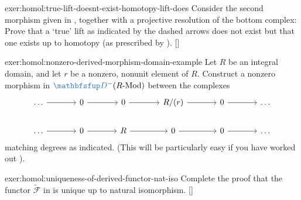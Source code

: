 \begin{exer}{\exerused{}}{exer:homol:true-lift-doesnt-exist-homotopy-lift-does}
  Consider the second morphism given in
  ,
  together with a projective resolution of the bottom complex:
  Prove that a `true' lift as indicated by the dashed arrows does not
  exist but that one exists up to homotopy (as prescribed by
  ). []
\end{exer}
\begin{exer}{}{exer:homol:nonzero-derived-morphism-domain-example}
  Let $R$ be an integral domain, and let $r$ be a nonzero, nonunit
  element of $R$. Construct a nonzero morphism in
  $\categ{D}^-(R\text{-Mod})$ between the complexes
  \[\begin{tikzcd}[column sep=large]
      \dots \arrow[r] & 0 \arrow[r] & 0 \arrow[r] & R/(r) \arrow[r] &
      0 \arrow[r] & \dots \\
      \dots \arrow[r] & 0 \arrow[r] & R \arrow[r] & 0 \arrow[r] & 0
      \arrow[r] & \dots
    \end{tikzcd}\] matching degrees as indicated. (This will be
  particularly easy if you have worked out
  ).
\end{exer}
\begin{exer}{\exerused{}}{exer:homol:uniqueness-of-derived-functor-nat-iso}
  Complete the proof that the functor $\widetilde{\mathscr{F}}$ in
   is unique up to natural
  isomorphism. []
\end{exer}
